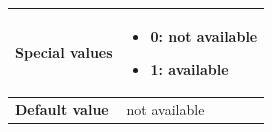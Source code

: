 \documentclass{template/openetcs}
\begin{document}
\begin{itemize}
\begin{longtable}{|l|l|}
					\begin{minipage}[t]{0.22\linewidth} \textbf{Special values}	\end{minipage} 
				&	\begin{minipage}[t]{0.78\linewidth} \begin{itemize} \item 0: not available \item 1: available \end{itemize} \end{minipage} \\
				
				\hline
				
					\begin{minipage}[t]{0.22\linewidth} \textbf{Default value}	\end{minipage} 
				&	\begin{minipage}[t]{0.78\linewidth} not available \end{minipage} \\
				
				\hline
				
			\end{longtable}
														
	\end{itemize}
\end{document}
